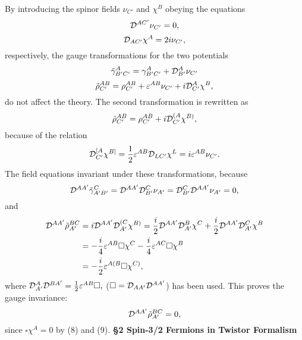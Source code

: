 \documentclass[a4paper,12pt]{article}
\begin{document}
By introducing the spinor fields $\nu_{C'}$ and $\chi^B$ obeying the equations
\begin{equation}{\cal D}^{AC'}\nu_{C'}=0,\end{equation}
\begin{equation}{\cal D}_{AC'}\chi^A=2i\nu_{C'},\end{equation}
respectively, the gauge transformations for the two potentials 
\begin{equation}
\tilde\gamma^A_{B'C'}=\gamma^A_{B'C'}+{\cal D}^A_{B'}\nu_{C'}
\end{equation}
\begin{equation}
\tilde\rho^{AB}_{C'}=\rho^{AB}_{C'}+\varepsilon^{AB}\nu_{C'}+i{\cal D}^A_{C'}\chi^B,
\end{equation}
do not affect the theory. 
The second transformation is rewritten as
\begin{equation}
\tilde\rho^{AB}_{C'}=\rho^{AB}_{C'}+i{\cal D}^{(A}_{C'}\chi^{B)},
\end{equation}
because of the relation
\begin{equation}
{\cal D}^{[A}_{C'}\chi^{B]}=\frac{1}{2}\varepsilon^{AB}{\cal D}_{LC'}\chi^L
=i\varepsilon^{AB}\nu_{C'}.
\end{equation}
The field equations invariant under these transformations, because  
\begin{equation}
{\cal D}^{AA'}\tilde\gamma^C_{A'B'}={\cal D}^{AA'}{\cal D}^C_{B'}\nu_{A'}
={\cal D}^C_{B'}{\cal D}^{AA'}\nu_{A'}=0,
\end{equation}
and
\begin{equation}
\begin{split}
{\cal D}^{AA'}\tilde\rho^{BC}_{A'}
&=i{\cal D}^{AA'}{\cal D}^{(C}_{A'}\chi^{B)}
=\frac{i}{2}{\cal D}^{AA'}{\cal D}^B_{A'}\chi^C+\frac{i}{2}{\cal D}^{AA'}{\cal D}^C_{A'}\chi^B\\
&=-\frac{i}{4}\varepsilon^{AB}\square\chi^C-\frac{i}{4}\varepsilon^{AC}\square\chi^B\\
&=-\frac{i}{2}\varepsilon^{A(B}\square\chi^{C)},
\end{split}
\end{equation}
where ${\cal D}^A_{A'}{\cal D}^{BA'}=\frac{1}{2}\varepsilon^{AB}\square ,$ ($\square ={\cal D}_{AA'}{\cal D}^{AA'}$) has been used.
This proves the gauge invariance:
\begin{equation}
{\cal D}^{AA'}\tilde\rho^{BC}_{A'}=0,
\end{equation}
since $\square\chi^A=0$ by (8) and (9).
\vskip 16pt
{\bf \S 2 Spin-3/2 Fermions in Twistor Formalism}
\vskip 16pt
\end{document}

